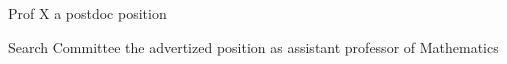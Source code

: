 

{Prof X}
{a postdoc position}
 
  
  
{Search Committee}
{the advertized position as assistant professor of Mathematics}

